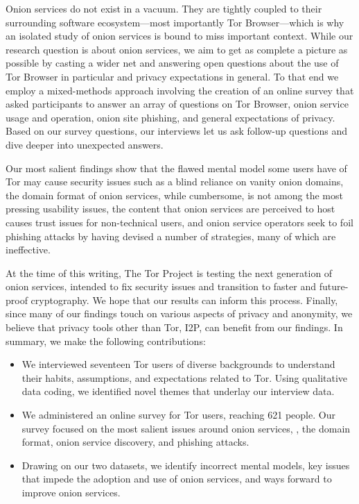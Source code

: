 Onion services do not exist in a vacuum.  They are tightly coupled to their
surrounding software ecosystem---most importantly Tor Browser---which is why an
isolated study of onion services is bound to miss important context.  While our
research question is about onion services, we aim to get as complete a picture
as possible by casting a wider net and answering open questions about the use of
Tor Browser in particular and privacy expectations in general.  To that end we
employ a mixed-methods approach involving the creation of an online survey that
asked participants to answer an array of questions on Tor Browser, onion service
usage and operation, onion site phishing, and general expectations of privacy.
Based on our survey questions, our interviews let us ask follow-up questions and
dive deeper into unexpected answers.

Our most salient findings show that \first the flawed mental model some users
have of Tor may cause security issues such as a blind reliance on vanity onion
domains, \second the domain format of onion services, while cumbersome, is not
among the most pressing usability issues, \third the content that onion services
are perceived to host causes trust issues for non-technical users, and \fourth
onion service operators seek to foil phishing attacks by having devised a number
of strategies, many of which are ineffective.

At the time of this writing, The Tor Project is testing the next generation of
onion services, intended to fix security issues and transition to faster and
future-proof cryptography.  We hope that our results can inform this process.
Finally, since many of our findings touch on various aspects of privacy and
anonymity, we believe that privacy tools other than Tor, \eg I2P, can benefit
from our findings.  In summary, we make the following contributions:

\begin{itemize}
    \item We interviewed seventeen Tor users of diverse backgrounds to
        understand their habits, assumptions, and expectations related to Tor.
        Using qualitative data coding, we identified novel themes that underlay
        our interview data.

    \item We administered an online survey for Tor users, reaching 621 people.
        Our survey focused on the most salient issues around onion services,
        \eg, the domain format, onion service discovery, and phishing attacks.

    \item Drawing on our two datasets, we identify \first incorrect mental
        models, \second key issues that impede the adoption and use of onion
        services, and \third ways forward to improve onion services.
\end{itemize}

